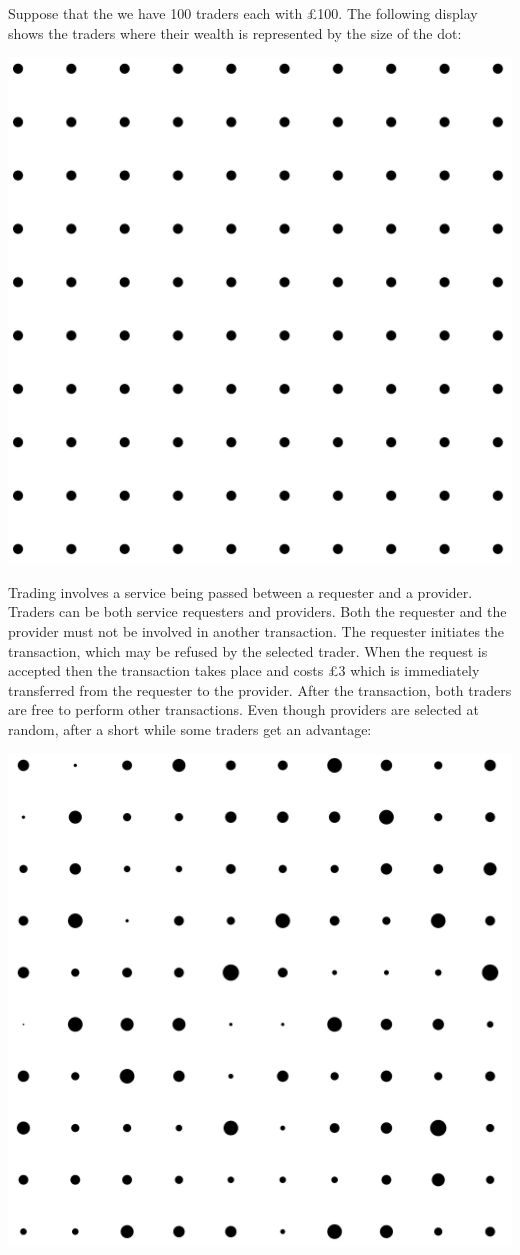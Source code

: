 \documentclass[5p,times]{elsarticle}
\begin{document}
Suppose that the we have 100 traders each with \pounds100. The following display shows the traders where their wealth is represented by the size of the dot:
\begin{center}
\includegraphics[width=0.75\columnwidth]{start_services}
\end{center}
Trading involves a service being passed between a requester and a provider. Traders can be both service requesters and providers. Both the requester and the provider must not be involved in another transaction. The requester initiates the transaction, which may be refused by the selected trader. When the request is accepted then the transaction takes place and costs \pounds3 which is immediately transferred from the requester to the provider. After the transaction, both traders are free to perform other transactions. Even though providers are selected at random, after a short while some traders get an advantage:
\begin{center}
\includegraphics[width=0.75\columnwidth]{mid_services}
\end{center}
\end{document}
